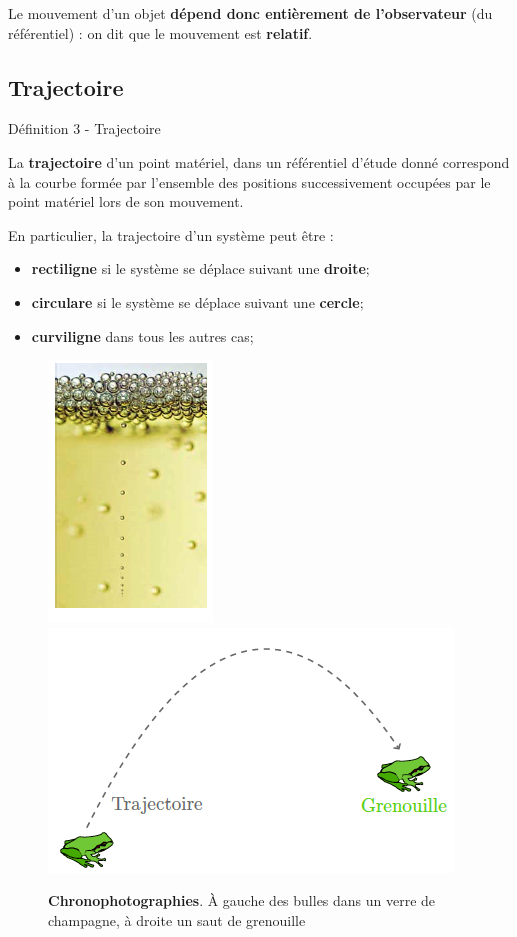 \documentclass[french, a4paper, 12pt, twocolumn, landscape]{article}
\begin{document}
	
Le mouvement d'un objet \textbf{dépend donc entièrement de l'observateur} (du référentiel) : on dit que le mouvement est \textbf{relatif}.


\clearpage
\subsection{Trajectoire}

\begin{definition}{Définition 3 - Trajectoire}

	La \textbf{trajectoire} d'un point matériel, dans un référentiel d'étude donné correspond à la courbe formée par l'ensemble des positions successivement occupées par le point matériel lors de son mouvement.

\end{definition}
\bigskip

En particulier, la trajectoire d'un système peut être : 

\begin{itemize}
	\item \textbf{rectiligne} si le système se déplace suivant une \textbf{droite};\medskip
	
	\item \textbf{circulare} si le système se déplace suivant une \textbf{cercle};\medskip
	
	\item \textbf{curviligne} dans tous les autres cas;

\end{itemize}

\begin{figure}[ht]
	\centering
	\includegraphics[width=.1\textwidth]{bulles.png}\hspace{.5cm}
	\includegraphics[width=.3\textwidth]{TrajectoireGrenouille.png}
	\caption{\textbf{Chronophotographies}. À gauche des bulles dans un verre de champagne, à droite un saut de grenouille}
\end{figure}
\vspace{3cm}
\end{document}

